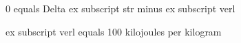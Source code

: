 0 equals Delta ex subscript str minus ex subscript verl  

ex subscript verl equals 100 kilojoules per kilogram